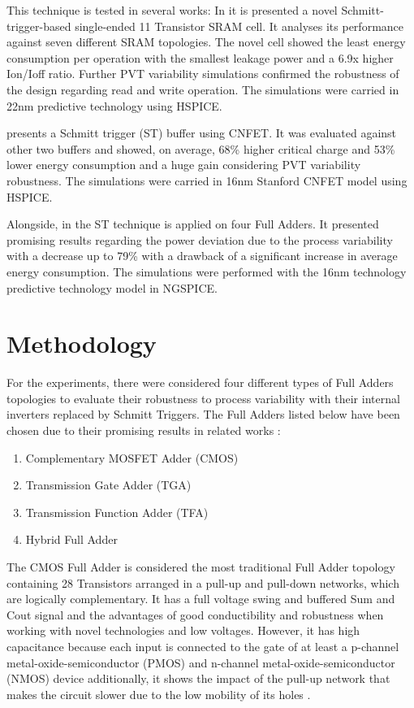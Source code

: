 \documentclass[ecp,tc, english]{iiufrgs}
\begin{document}
This technique is tested in several works: In \cite{ahmad2016single} it is presented a novel Schmitt-trigger-based single-ended 11 Transistor SRAM cell. It analyses its performance against seven different SRAM topologies. The novel cell showed the least energy consumption per operation with the smallest leakage power and a 6.9x higher Ion/Ioff ratio. Further PVT variability simulations confirmed the robustness of the design regarding read and write operation. The simulations were carried in 22nm predictive technology using HSPICE.

\cite{moghaddam2017design} presents a Schmitt trigger (ST) buffer using CNFET. It was evaluated against other two buffers and showed, on average, 68\% higher critical charge and 53\% lower energy consumption and a huge gain considering PVT variability robustness. The simulations were carried in 16nm Stanford CNFET model using HSPICE.
	
Alongside, in \cite{samuel2016} the ST technique is applied on four Full Adders. It presented promising results regarding the power deviation due to the process variability with a decrease up to 79\% with a drawback of a significant increase in average energy consumption. The simulations were performed with the 16nm technology predictive technology model in NGSPICE. 

\chapter{Methodology}

For the experiments, there were considered four different types of Full Adders topologies to evaluate their robustness to process variability with their internal inverters replaced by Schmitt Triggers. The Full Adders listed below have been chosen due to their promising results in related works \cite{ames2016investigating} \cite{dokania2015circuit} \cite{dokania2013investigation}:

\begin{enumerate}
    \item Complementary MOSFET Adder (CMOS)
    \item Transmission Gate Adder (TGA)
    \item Transmission Function Adder (TFA)
    \item Hybrid Full Adder
\end{enumerate}

The CMOS Full Adder is considered the most traditional Full Adder topology containing 28 Transistors arranged in a pull-up and pull-down networks, which are logically complementary. It has a full voltage swing and buffered Sum and Cout signal and the advantages of good conductibility and robustness when working with novel technologies and low voltages. However, it has high capacitance because each input is connected to the gate of at least a p-channel metal-oxide-semiconductor (PMOS) and n-channel metal-oxide-semiconductor (NMOS) device additionally, it shows the impact of the pull-up network that makes the circuit slower due to the low mobility of its holes \cite{beckett2002fine} \cite{devadas2017design} \cite{islam2011design}. 
\end{document}
